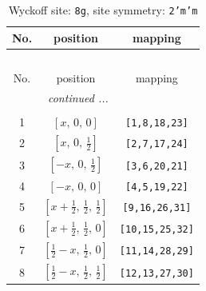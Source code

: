 \documentclass[fleqn,8pt]{jsarticle}
\begin{document}
\begin{longtable}{ccc}
\caption{Wyckoff site: {\tt 8g}, site symmetry: {\tt 2'm'm}}
 \\
 \hline \hline
No. & position & mapping \\ \hline \endfirsthead

\multicolumn{2}{l}{\tablename\ \thetable{}} \\
 \hline \hline
No. & position & mapping \\ \hline \endhead

 \hline \hline
\multicolumn{2}{r}{\footnotesize\it continued ...} \\ \endfoot

 \hline \hline
\multicolumn{2}{r}{} \\ \endlastfoot

1 & $\left[ x,\, 0,\, 0 \right]$ & {\tt [1,8,18,23]} \\ \hline
2 & $\left[ x,\, 0,\, \frac{1}{2} \right]$ & {\tt [2,7,17,24]} \\ \hline
3 & $\left[ - x,\, 0,\, \frac{1}{2} \right]$ & {\tt [3,6,20,21]} \\ \hline
4 & $\left[ - x,\, 0,\, 0 \right]$ & {\tt [4,5,19,22]} \\ \hline
5 & $\left[ x + \frac{1}{2},\, \frac{1}{2},\, \frac{1}{2} \right]$ & {\tt [9,16,26,31]} \\ \hline
6 & $\left[ x + \frac{1}{2},\, \frac{1}{2},\, 0 \right]$ & {\tt [10,15,25,32]} \\ \hline
7 & $\left[ \frac{1}{2} - x,\, \frac{1}{2},\, 0 \right]$ & {\tt [11,14,28,29]} \\ \hline
8 & $\left[ \frac{1}{2} - x,\, \frac{1}{2},\, \frac{1}{2} \right]$ & {\tt [12,13,27,30]} \\
\end{longtable}
\renewcommand{\arraystretch}{1.2}
\end{document}
